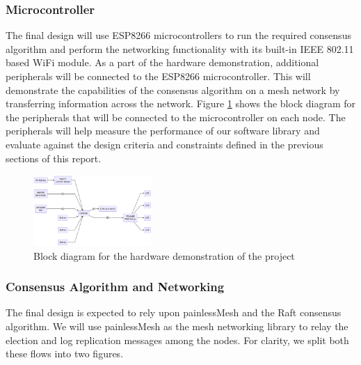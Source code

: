 \vspace{-25pt}
\subsubsection{Microcontroller}
The final design will use ESP8266 microcontrollers to run the required consensus algorithm and perform the networking functionality with its built-in IEEE 802.11 based WiFi module. As a part of the hardware demonstration, additional peripherals will be connected to the ESP8266 microcontroller. This will demonstrate the capabilities of the consensus algorithm on a mesh network by transferring information across the network. Figure \ref{fig:final_design_prototype} shows the block diagram for the peripherals that will be connected to the microcontroller on each node. The peripherals will help measure the performance of our software library and evaluate against the design criteria and constraints defined in the previous sections of this report.

\begin{figure}[H]
    \centering
    \includegraphics[width=0.4\textwidth]{images/final_design_prototype.png}
    \caption{Block diagram for the hardware demonstration of the project}
    \label{fig:final_design_prototype}
    


  
\end{figure}


\subsubsection{Consensus Algorithm and Networking}
The final design is expected to rely upon painlessMesh and the Raft consensus algorithm. We will use painlessMesh as the mesh networking library to relay the election and log replication messages among the nodes. For clarity, we split both these flows into two figures.

